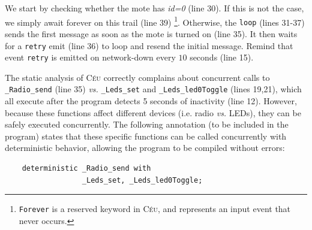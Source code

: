 \documentclass{sig-alternate}
\newcommand{\2}{\;\;}
\newcommand{\5}{\;\;\;\;\;}
\newcommand{\CEU}{\textsc{C\'{e}u}}
\newcommand{\code}[1] {{\small{\texttt{#1}}}}
\begin{document}
We start by checking whether the mote has \emph{id=0} (line 30).
If this is not the case, we simply await forever on this trail (line 39)%
\footnote{\code{Forever} is a reserved keyword in \CEU, and represents an input 
event that never occurs.}.
Otherwise, the \code{loop} (lines 31-37) sends the first message as soon as the 
mote is turned on (line 35).
It then waits for a \code{retry} emit (line 36) to loop and resend the initial 
message.
Remind that event \code{retry} is emitted on network-down every $10$ seconds 
(line 15).

The static analysis of \CEU{} correctly complains about concurrent calls to 
\code{\_Radio\_send} (line 35) \emph{vs.} \code{\_Leds\_set} and 
\code{\_Leds\_led0Toggle} (lines 19,21), which all execute after the program 
detects 5 seconds of inactivity (line 12).
However, because these functions affect different devices (i.e. radio 
\emph{vs.} LEDs), they can be safely executed concurrently.
The following annotation (to be included in the program) states that these 
specific functions can be called concurrently with deterministic behavior, 
allowing the program to be compiled without errors:

{\small
\begin{verbatim}
    deterministic _Radio_send with
                  _Leds_set, _Leds_led0Toggle;
\end{verbatim}
}
\end{document}
